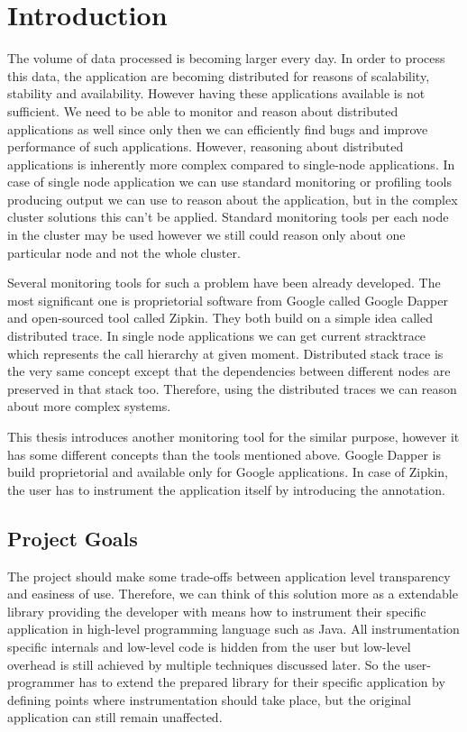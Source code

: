 \chapter{Introduction}
The volume of data processed is becoming larger every day. In order to process this data, the application are becoming distributed for reasons of scalability, stability and availability. However having these applications available is not sufficient. We need to be able to monitor and reason about distributed applications as well since only then we can efficiently find bugs and improve performance of such applications. However, reasoning about distributed applications is inherently more complex compared to single-node applications. In case of single node application we can use standard monitoring or profiling tools producing output we can use to reason about the application, but in the complex cluster solutions this can't be applied. Standard monitoring tools per each node in the cluster may be used however we still could reason only about one particular node and not the whole cluster.

Several monitoring tools for such a problem have been already developed. The most significant one is proprietorial software from Google called Google Dapper and open-sourced tool called Zipkin. They both build on a simple idea called distributed trace. In single node applications we can get current stracktrace which represents the call hierarchy at given moment. Distributed stack trace is the very same concept except that the dependencies between different nodes are preserved in that stack too. Therefore, using the distributed traces we can reason about more complex systems.

This thesis introduces another monitoring tool for the similar purpose, however it has some different concepts than the tools mentioned above. Google Dapper is build proprietorial and available only for Google applications. In case of Zipkin, the user has to instrument the application itself by introducing the annotation. 

\section{Project Goals}
The project should make some trade-offs between application level transparency and easiness of use. Therefore, we can think of this solution more as a extendable library providing the developer with means how to instrument their specific application in high-level programming language such as Java. All instrumentation specific internals and low-level code is hidden from the user but low-level overhead is still achieved by multiple techniques discussed later. So the user-programmer has to extend the prepared library for their specific application by defining points where instrumentation should take place, but the original application can still remain unaffected.

